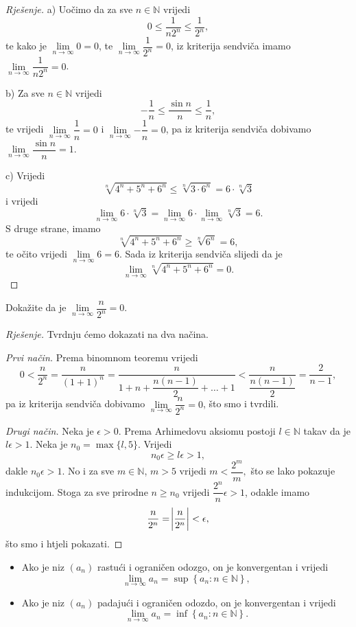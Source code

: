 \begin{proof}[Rješenje]
a) Uočimo da za sve $n\in \mathbb{N}$ vrijedi
$$0\leq \dfrac{1}{n2^n}\leq \dfrac{1}{2^n},$$
te kako je $\lim\limits_{n\to \infty}{0}=0$, te $\lim\limits_{n\to \infty}{\dfrac{1}{2^n}}=0$, iz kriterija sendviča imamo $\lim\limits_{n\to \infty}{\dfrac{1}{n2^n}}=0$.

b) Za sve $n\in \mathbb{N}$ vrijedi
$$-\dfrac{1}{n}\leq \dfrac{\sin{n}}{n}\leq \dfrac{1}{n},$$
te vrijedi $\lim\limits_{n\to \infty}{\dfrac{1}{n}}=0$ i $\lim\limits_{n\to \infty}{-\dfrac{1}{n}}=0$, pa iz kriterija sendviča dobivamo $\lim\limits_{n\to \infty}{\dfrac{\sin{n}}{n}}=1$.

c) Vrijedi $$\sqrt[n]{4^n+5^n+6^n}\leq \sqrt[n]{3\cdot 6^n}=6\cdot \sqrt[n]{3}$$ i vrijedi $$\lim\limits_{n\to \infty}{6\cdot \sqrt[n]{3}}=\lim\limits_{n\to \infty}{6}\cdot \lim\limits_{n\to \infty}{\sqrt[n]{3}}=6.$$ S druge strane, imamo $$\sqrt[n]{4^n+5^n+6^n}\geq \sqrt[n]{6^n}=6,$$ 
te očito vrijedi $\lim\limits_{n\to \infty}{6}=6$. Sada iz kriterija sendviča slijedi da je $$\lim\limits_{n\to \infty}{\sqrt[n]{4^n+5^n+6^n}}=0.$$
\end{proof}
\begin{exercise}
\label{7}
Dokažite da je $\lim\limits_{n\to \infty}{\dfrac{n}{2^n}}=0$.
\end{exercise}
\begin{proof}[Rješenje] Tvrdnju ćemo dokazati na dva načina.

\textit{Prvi način.} Prema binomnom teoremu vrijedi
$$0<\dfrac{n}{2^n}=\dfrac{n}{(1+1)^n}=\dfrac{n}{1+n+\dfrac{n(n-1)}{2}+\dots+1}<\dfrac{n}{\dfrac{n(n-1)}{2}}=\dfrac{2}{n-1},$$
pa iz kriterija sendviča dobivamo $\lim\limits_{n\to \infty}{\dfrac{n}{2^n}}=0$, što smo i tvrdili.

\textit{Drugi način.} Neka je $\epsilon>0$. Prema Arhimedovu aksiomu postoji $l\in \mathbb{N}$ takav da je $l\epsilon>1$. Neka je $n_0=\max\{l, 5\}$. Vrijedi
$$n_0\epsilon\geq l\epsilon>1,$$
dakle $n_0\epsilon>1$. No i za sve $m\in \mathbb{N}$, $m>5$ vrijedi $m<\dfrac{2^m}{m},$ što se lako pokazuje indukcijom. Stoga za sve prirodne $n\geq n_0$ vrijedi $\dfrac{2^{n}}{n}\epsilon>1$, odakle imamo $$\dfrac{n}{2^n}=\abs{\dfrac{n}{2^n}}<\epsilon,$$
što smo i htjeli pokazati.
\end{proof}
\begin{remark} \textbf{}
\label{suffcond}
\begin{itemize}
\item Ako je niz $(a_n)$ rastući i ograničen odozgo, on je konvergentan i vrijedi $$\lim\limits_{n\to\infty}{a_n}=\sup{\left\{a_n : n\in \mathbb{N}\right\}},$$
\item Ako je niz $(a_n)$ padajući i ograničen odozdo, on je konvergentan i vrijedi $$\lim\limits_{n\to\infty}{a_n}=\inf{\left\{a_n : n\in \mathbb{N}\right\}}.$$
\end{itemize}
\end{remark}
